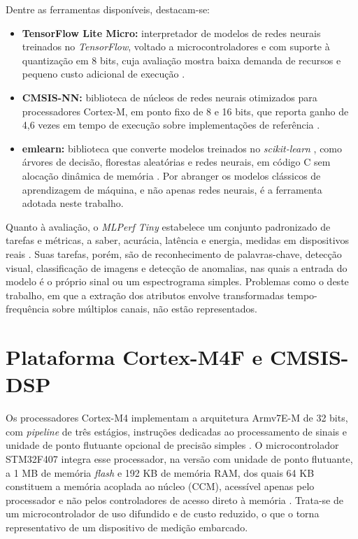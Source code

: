 \documentclass[
	12pt,				%
	openright,			%
	oneside,			%
	a4paper,			%
	english,			%
	brazil,				%
	]{abntex2}
\begin{document}
Dentre as ferramentas disponíveis, destacam-se:

\begin{itemize}
    \item \textbf{TensorFlow Lite Micro:} interpretador de modelos de redes neurais treinados no \textit{TensorFlow}, voltado a microcontroladores e com suporte à quantização em 8 bits, cuja avaliação mostra baixa demanda de recursos e pequeno custo adicional de execução \cite{david_tflm}.

    \item \textbf{CMSIS-NN:} biblioteca de núcleos de redes neurais otimizados para processadores Cortex-M, em ponto fixo de 8 e 16 bits, que reporta ganho de 4,6 vezes em tempo de execução sobre implementações de referência \cite{lai_cmsisnn}.

    \item \textbf{emlearn:} biblioteca que converte modelos treinados no \textit{scikit-learn} \cite{[52]}, como árvores de decisão, florestas aleatórias e redes neurais, em código C sem alocação dinâmica de memória \cite{nordby_emlearn}. Por abranger os modelos clássicos de aprendizagem de máquina, e não apenas redes neurais, é a ferramenta adotada neste trabalho.
\end{itemize}

Quanto à avaliação, o \textit{MLPerf Tiny} estabelece um conjunto padronizado de tarefas e métricas, a saber, acurácia, latência e energia, medidas em dispositivos reais \cite{banbury_mlperf}. Suas tarefas, porém, são de reconhecimento de palavras-chave, detecção visual, classificação de imagens e detecção de anomalias, nas quais a entrada do modelo é o próprio sinal ou um espectrograma simples. Problemas como o deste trabalho, em que a extração dos atributos envolve transformadas tempo-frequência sobre múltiplos canais, não estão representados.

\section{Plataforma Cortex-M4F e CMSIS-DSP}
Os processadores Cortex-M4 implementam a arquitetura Armv7E-M de 32 bits, com \textit{pipeline} de três estágios, instruções dedicadas ao processamento de sinais e unidade de ponto flutuante opcional de precisão simples \cite{arm_cm4}. O microcontrolador STM32F407 integra esse processador, na versão com unidade de ponto flutuante, a 1 MB de memória \textit{flash} e 192 KB de memória RAM, dos quais 64 KB constituem a memória acoplada ao núcleo (CCM), acessível apenas pelo processador e não pelos controladores de acesso direto à memória \cite{st_rm0090}. Trata-se de um microcontrolador de uso difundido e de custo reduzido, o que o torna representativo de um dispositivo de medição embarcado.
\end{document}
